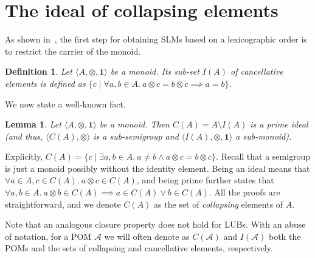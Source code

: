 \documentclass[a4paper]{elsarticle}
\newtheorem{definition}{Definition}
\newtheorem{lemma}{Lemma}
\newcommand{\monop}{\otimes}
\newcommand{\1}{\mathbf{1}}
\begin{document}

\section{The ideal of collapsing elements}
\label{sec:collapsing}
As shown in~\cite{GadducciHMW13}, the first step for obtaining SLMs based on a lexicographic order 
is to restrict the carrier of the monoid. 

\begin{definition}
	Let $\langle A, \monop, \1 \rangle$ be a monoid. Its sub-set $I(A)$ 
	of \emph{cancellative} elements is defined as 
	$\{ c \mid \forall a, b \in A.\ a \otimes c = b \otimes c \implies a = b \}$.
\end{definition}

We  now state a well-known fact. 

\begin{lemma}
	\label{ideal}
	Let $\langle A, \monop, \1 \rangle$ be a monoid.
	Then $C(A) = A\setminus I(A)$ is
	a prime ideal (and thus, $\langle C(A), \monop \rangle$ is a sub-semigroup
	and $\langle I(A), \monop, \1 \rangle$ a sub-monoid).
\end{lemma}

Explicitly, $C(A) = \{ c \mid \exists a, b \in A.\ a \neq b \wedge a \otimes c = b \otimes c\}$.
%
Recall that a semigroup is just a monoid possibly without the identity element.
Being an ideal means that $\forall a \in A, c \in C( A).\ a \otimes c \in C(A)$,
and being prime further states that 
$\forall a, b \in A.\ a\otimes b \in C( A) \implies a \in C(A) \vee b \in C(A)$.
%
All the proofs are straightforward, and we denote $C(A)$ as the set of \emph{collapsing} 
elements of $A$. 

Note that an analogous closure property does not hold for LUBs. With an abuse of notation,
for a POM $\mathcal{A}$ we will often denote as $C(\mathcal{A})$ and $I(\mathcal{A})$ both the POMs 
and the sets of collapsing and cancellative elements, respectively.
\end{document}
